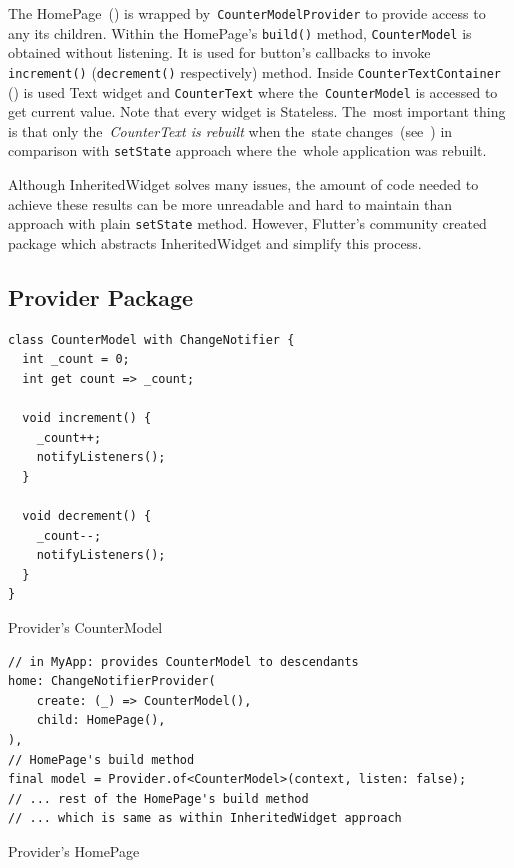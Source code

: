 The HomePage~() is wrapped by~\verb|CounterModelProvider| to provide access to any its children. Within the HomePage's \verb|build()| method, \verb|CounterModel| is obtained without listening. It is used for button's callbacks to invoke \verb|increment()| (\verb|decrement()| respectively) method. Inside \verb|CounterTextContainer| () is used Text widget and \verb|CounterText| where the~\verb|CounterModel| is accessed to get current value. Note that every widget is Stateless. The~most important thing is that only the~\textit{CounterText is rebuilt} when the~state changes~(see~) in comparison with \verb|setState| approach where the~whole application was rebuilt.

Although InheritedWidget solves many issues, the amount of code needed to achieve these results can be more unreadable and hard to maintain than approach with plain \verb|setState| method. However, Flutter's community created package which abstracts InheritedWidget and simplify this process. 
\subsection{Provider Package}

\begin{listing}[ht]
\begin{verbatim}
class CounterModel with ChangeNotifier {
  int _count = 0;
  int get count => _count;

  void increment() {
    _count++;
    notifyListeners();
  }

  void decrement() {
    _count--;
    notifyListeners();
  }
}
\end{verbatim}
\caption{Provider's CounterModel}
\label{listing:counter-provider-model}
\end{listing}

\begin{listing}[ht]
\begin{verbatim}
// in MyApp: provides CounterModel to descendants
home: ChangeNotifierProvider(
    create: (_) => CounterModel(),
    child: HomePage(),
),
// HomePage's build method
final model = Provider.of<CounterModel>(context, listen: false);
// ... rest of the HomePage's build method
// ... which is same as within InheritedWidget approach
\end{verbatim}
\caption{Provider's HomePage}
\label{listing:counter-provider-home-page}
\end{listing}

